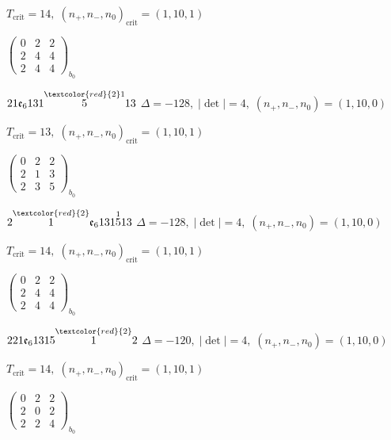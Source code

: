 \documentclass[10pt]{article}
\begin{document}
\hspace{1em}$T_{\text{crit}}=14,\; (n_+,n_-,n_0)_{\text{crit}}=(1,10,1)$

\hspace{2em}$\left(\begin{smallmatrix}0 & 2 & 2 \\ 2 & 4 & 4 \\ 2 & 4 & 4\end{smallmatrix}\right)_{\!b_0}$

\smallskip

$21\mathfrak{e}_6131\overset{\textcolor{red}{2}1}{5}13$ \quad $\Delta=-128,\; |\det|=4,\; (n_+,n_-,n_0)=(1,10,0)$

\hspace{1em}$T_{\text{crit}}=13,\; (n_+,n_-,n_0)_{\text{crit}}=(1,10,1)$

\hspace{2em}$\left(\begin{smallmatrix}0 & 2 & 2 \\ 2 & 1 & 3 \\ 2 & 3 & 5\end{smallmatrix}\right)_{\!b_0}$

$2\overset{\textcolor{red}{2}}{1}\mathfrak{e}_6131\overset{1}{5}13$ \quad $\Delta=-128,\; |\det|=4,\; (n_+,n_-,n_0)=(1,10,0)$

\hspace{1em}$T_{\text{crit}}=14,\; (n_+,n_-,n_0)_{\text{crit}}=(1,10,1)$

\hspace{2em}$\left(\begin{smallmatrix}0 & 2 & 2 \\ 2 & 4 & 4 \\ 2 & 4 & 4\end{smallmatrix}\right)_{\!b_0}$

\smallskip

$221\mathfrak{e}_61315\overset{\textcolor{red}{2}}{1}2$ \quad $\Delta=-120,\; |\det|=4,\; (n_+,n_-,n_0)=(1,10,0)$

\hspace{1em}$T_{\text{crit}}=14,\; (n_+,n_-,n_0)_{\text{crit}}=(1,10,1)$

\hspace{2em}$\left(\begin{smallmatrix}0 & 2 & 2 \\ 2 & 0 & 2 \\ 2 & 2 & 4\end{smallmatrix}\right)_{\!b_0}$
\end{document}
